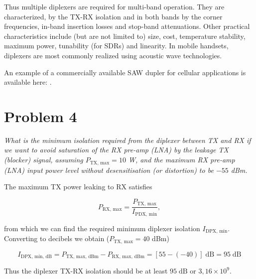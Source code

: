 \documentclass[a4paper, 12pt]{article}
\begin{document}
Thus multiple diplexers are required for multi-band operation. They are 
characterized, by the TX-RX isolation and in both bands by the corner
frequencies, in-band insertion losses and stop-band attenuations. Other 
practical characteristics include (but are not limited to) size, cost, 
temperature stability, maximum power, tunability (for SDRs) and linearity. 
In mobile handsets, diplexers are most commonly realized using acoustic 
wave technologies. \cite{kandi}

An example of a commercially available SAW dupler for cellular applications 
is available here: \cite{triquint}.


\section*{Problem 4}

\textit{What is the minimum isolation required from the diplexer between TX and RX 
if we want to avoid saturation of the RX pre-amp (LNA) by the leakage TX (blocker) 
signal, assuming $P_\mathrm{TX,\,max} = 10$ W, and the maximum RX pre-amp (LNA) 
input power level without desensitisation (or distortion) to be $-55$ dBm.}

The maximum TX power leaking to RX satisfies

\begin{equation}
P_\mathrm{RX,\,max} = \frac{P_\mathrm{TX,\,max}}{I_\mathrm{PDX,\,min}},
\end{equation}
\vspace{2pt}

\noindent from which we can find the required minimum diplexer isolation $I_\mathrm{DPX,\,min}$. 
Converting to decibels we obtain ($P_\mathrm{TX,\,max} = 40$ dBm)

\begin{equation}
I_\mathrm{DPX,\,min,\,dB} = P_\mathrm{TX,\,max,\,dBm} - P_\mathrm{RX,\,max,\,dBm} 
	= \left[ 55 - (-40) \right] \mathrm{\;dB}
	= 95 \mathrm{\;dB}
\end{equation}
\vspace{2pt}

\noindent Thus the diplexer TX-RX isolation should be at least $95 \mathrm{\;dB}$ or $3,\!16 \times 10^9$.
\end{document}
